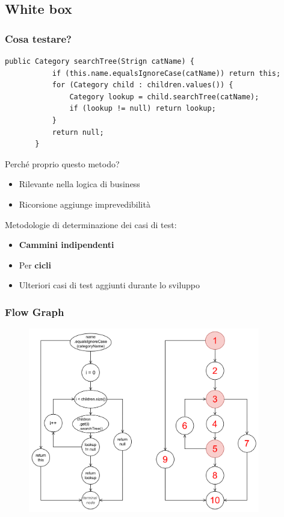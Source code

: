 \subsection{White box}
\beamertitle
\begin{frame} [fragile]
    \frametitle{Cosa testare?}
    \begin{lstlisting}[autogobble, title={\texttt{Category.java}}]
       public Category searchTree(Strign catName) {
           if (this.name.equalsIgnoreCase(catName)) return this;
           for (Category child : children.values()) {
               Category lookup = child.searchTree(catName);
               if (lookup != null) return lookup;
           }
           return null;
       }
    \end{lstlisting}
    Perché proprio questo metodo?
    \begin{itemize}
        \item Rilevante nella logica di business
        \item Ricorsione aggiunge imprevedibilità
    \end{itemize}
    Metodologie di determinazione dei casi di test:
    \begin{itemize}
        \item \textbf{Cammini indipendenti}
        \item Per \textbf{cicli}
        \item Ulteriori casi di test aggiunti durante lo sviluppo
    \end{itemize}
\end{frame}

\begin{frame}
    \frametitle{Flow Graph}
    \begin{figure}
        \includegraphics[width=0.9\textwidth]{img/flowGraphSearchTree.png}
    \end{figure}
\end{frame}

